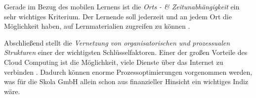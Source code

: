 Gerade im Bezug des mobilen Lernens ist die \textit{Orts - \& Zeitunabhängigkeit} ein sehr wichtiges Kriterium. Der Lernende soll jederzeit und an jedem Ort die Möglichkeit haben, auf Lernmaterialien zugreifen zu können \cite{grella}.

Abschließend stellt die \textit{Vernetzung von organisatorischen und prozessualen Strukturen} einer der wichtigsten Schlüsselfaktoren. Einer der großen Vorteile des Cloud Computing ist die Möglichkeit, viele Dienste über das Internet zu verbinden \cite{krcmar}. Dadurch können enorme Prozessoptimierungen vorgenommen werden, was für die Skola GmbH allein schon aus finanzieller Hinsicht ein wichtiges Indiz wäre.
